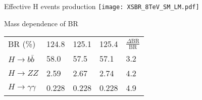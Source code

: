 \begin{frame}{Effective H events production}
  \centering
  \texttt{[image: XSBR\_8TeV\_SM\_LM.pdf]}
\end{frame}

\begin{frame}{Mass dependence of BR}
  \centering
  \begin{tabular}{lllll}
    BR (\%) & 124.8 & 125.1 & 125.4 & $\frac{\Delta \text{BR}}{\text{BR}}$\\
    $H\rightarrow b\bar{b}$ & 58.0 & 57.5 & 57.1 & 3.2\\
    $H\rightarrow ZZ$ & 2.59 & 2.67 & 2.74 & 4.2\\
    $H\rightarrow \gamma\gamma$ & 0.228 & 0.228 & 0.228 & 4.9\\
  \end{tabular}
\end{frame}
